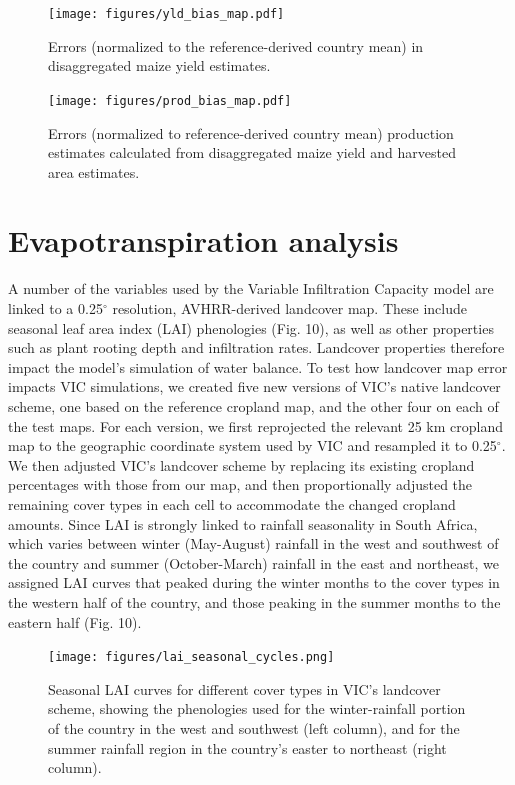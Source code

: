 \documentclass[11pt, titlepage]{article}
\begin{document}
\clearpage
\begin{figure}[ht]
  \centering
     \texttt{[image: figures/yld\_bias\_map.pdf]} 
      \caption{Errors (normalized to the reference-derived country mean) in disaggregated maize yield estimates.}
      \label{fig:default}
\end{figure}

\begin{figure}[ht]
  \centering
     \texttt{[image: figures/prod\_bias\_map.pdf]} 
      \caption{Errors (normalized to reference-derived country mean) production estimates calculated from disaggregated maize yield and harvested area estimates.}
      \label{fig:default}
\end{figure}

\FloatBarrier


\section{\large Evapotranspiration analysis}
%
A number of the variables used by the Variable Infiltration Capacity \cite[VIC][]{liang_simple_1994} model are linked to a 0.25$^{\circ}$ resolution, AVHRR-derived landcover map. These include seasonal leaf area index (LAI) phenologies (Fig. 10), as well as other properties such as plant rooting depth and infiltration rates. Landcover properties therefore impact the model's simulation of water balance. To test how landcover map error impacts VIC simulations, we created five new versions of VIC's native landcover scheme, one based on the reference cropland map, and the other four on each of the test maps. For each version, we first reprojected the relevant 25 km cropland map to the geographic coordinate system used by VIC and resampled it to 0.25$^{\circ}$. We then adjusted VIC's landcover scheme by replacing its existing cropland percentages with those from our map, and then proportionally adjusted the remaining cover types in each cell to accommodate the changed cropland amounts. Since LAI is strongly linked to rainfall seasonality in South Africa, which varies between winter (May-August) rainfall in the west and southwest of the country and summer (October-March) rainfall in the east and northeast, we assigned LAI curves that peaked during the winter months to the cover types in the western half of the country, and those peaking in the summer months to the eastern half (Fig. 10). 

\begin{figure}[!ht]
  \centering
     \texttt{[image: figures/lai\_seasonal\_cycles.png]} 
      \caption{Seasonal LAI curves for different cover types in VIC's landcover scheme, showing the phenologies used for the winter-rainfall portion of the country in the west and southwest (left column), and for the summer rainfall region in the country's easter to northeast (right column). }
      \label{fig:default}
\end{figure}
\end{document}
